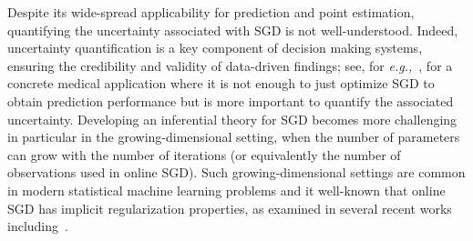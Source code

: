 \documentclass[11pt, reqno,english]{amsart}
\begin{document}
Despite its wide-spread applicability for prediction and point estimation, quantifying the uncertainty associated with SGD is not well-understood. Indeed, uncertainty quantification is a key component of decision making systems, ensuring the credibility and validity of data-driven findings; see, for \emph{e.g.,}~\cite{chee2022plus}, for a concrete medical application where it is not enough to just optimize SGD to obtain prediction performance but is more important to quantify the associated uncertainty. Developing an inferential theory for SGD becomes more challenging in particular in the growing-dimensional setting, when the number of parameters can grow with the number of iterations (or equivalently the number of observations used in online SGD). Such growing-dimensional settings are common in modern statistical machine learning problems and it well-known that online SGD has implicit regularization properties, as examined in several recent works including~\cite{ali2020implicit, varre2021last, zou2021benign,wu2022last,chen2022dimension}.
 
\end{document}
